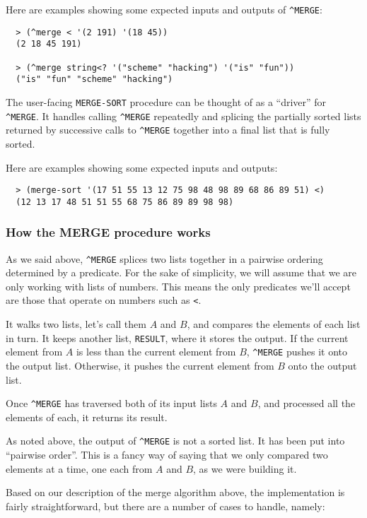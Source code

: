 \documentclass[12pt,openright,draft]{book}
\begin{document}
Here are examples showing some expected inputs and outputs of
\verb|^MERGE|:

\begin{verbatim}
  > (^merge < '(2 191) '(18 45))
  (2 18 45 191)

  > (^merge string<? '("scheme" "hacking") '("is" "fun"))
  ("is" "fun" "scheme" "hacking")
\end{verbatim}

The user-facing \verb|MERGE-SORT| procedure can be thought of as a
``driver'' for \verb|^MERGE|.  It handles calling \verb|^MERGE|
repeatedly and splicing the partially sorted lists returned by
successive calls to \verb|^MERGE| together into a final list that is
fully sorted.

Here are examples showing some expected inputs and outputs:

\begin{verbatim}
  > (merge-sort '(17 51 55 13 12 75 98 48 98 89 68 86 89 51) <)
  (12 13 17 48 51 51 55 68 75 86 89 89 98 98)
\end{verbatim}

\subsubsection{How the MERGE procedure works}

As we said above, \verb|^MERGE| splices two lists together in a
pairwise ordering determined by a predicate.  For the sake of
simplicity, we will assume that we are only working with lists of
numbers.  This means the only predicates we'll accept are those that
operate on numbers such as \verb|<|.

It walks two lists, let's call them $A$ and $B$, and compares the
elements of each list in turn.  It keeps another list, \verb|RESULT|,
where it stores the output.  If the current element from $A$ is less
than the current element from $B$, \verb|^MERGE| pushes it onto the
output list.  Otherwise, it pushes the current element from $B$ onto
the output list.

Once \verb|^MERGE| has traversed both of its input lists $A$ and $B$,
and processed all the elements of each, it returns its result.

As noted above, the output of \verb|^MERGE| is not a sorted list.  It
has been put into ``pairwise order''.  This is a fancy way of saying
that we only compared two elements at a time, one each from $A$ and
$B$, as we were building it.

Based on our description of the merge algorithm above, the
implementation is fairly straightforward, but there are a number of
cases to handle, namely:
\end{document}
